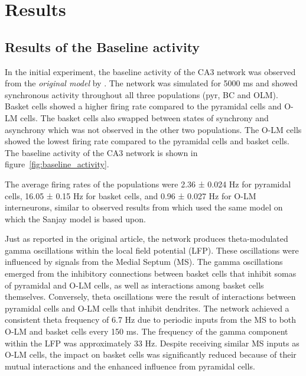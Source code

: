 \chapter{Results}


\section{Results of the Baseline activity}
In the initial experiment, the baseline activity of the CA3 network was
observed from the \textit{original model} by
\textcite{sanjayImpairedDendriticInhibition2015}. The network was simulated for
5000 ms and showed synchronous activity throughout all three
populations (pyr, BC and OLM). Basket cells showed a higher firing rate
compared to the pyramidal cells and O-LM cells. The basket cells also swapped
between states of synchrony and asynchrony which was not observed in the other
two populations. The O-LM cells showed the lowest firing rate compared to the
pyramidal cells and basket cells. The baseline activity of the CA3 network is
shown in figure~\ref{fig:baseline_activity}.

The average firing rates of the populations were 2.36 ± 0.024 Hz for pyramidal cells,
16.05 ± 0.15 Hz for basket cells, and 0.96 ± 0.027 Hz for O-LM interneurons,
similar to observed results from \textcite{neymotinKetamineDisruptsTheta2011} which used the same model on which the Sanjay model is based upon.

Just as reported in the original article, the network produces theta-modulated gamma oscillations
within the local field potential (LFP). These oscillations were influenced by signals from the Medial Septum (MS).
The gamma oscillations emerged from the inhibitory connections between basket cells that inhibit somas of pyramidal and O-LM cells,
as well as interactions among basket cells themselves. Conversely, theta oscillations were the result of interactions between
pyramidal cells and O-LM cells that inhibit dendrites. The network achieved a consistent theta frequency of 6.7 Hz due to periodic inputs
from the MS to both O-LM and basket cells every 150 ms. The frequency of the gamma component within the LFP was approximately 33 Hz.
Despite receiving similar MS inputs as O-LM cells, the impact on basket cells was significantly reduced because of their mutual interactions
and the enhanced influence from pyramidal cells.

